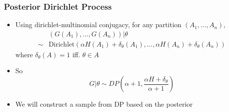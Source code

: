 \documentclass{beamer}
\begin{document}
\begin{frame}
	\frametitle{Posterior Dirichlet Process}
	\begin{itemize}

		\item Using dirichlet-multinomial conjugacy, for any partition $(A_1, \ldots, A_n)$,
		\begin{align*}
		& (G(A_1), \ldots, G(A_n))|\theta \\
		\sim & \text{Dirichlet}(\alpha H(A_1)+\delta_{\theta}(A_1), \ldots, \alpha H(A_n)+\delta_{\theta}(A_n))
		\end{align*}
		where $\delta_{\theta}(A)=1$ iff. $\theta \in A$
		\pause
		\item So 
		\[
		G|\theta \sim DP(\alpha+1, \frac{\alpha H + \delta_{\theta}}{\alpha+1})
		\]		
		\item We will construct a sample from DP based on the posterior
	\end{itemize}
\end{frame}
\end{document}

